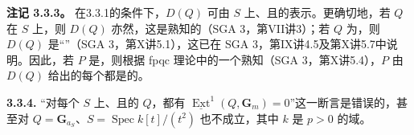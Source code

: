 \textbf{注记 3.3.3。} 在3.3.1的条件下，$D(Q)$ 可由 $S$ 上、且的表示。更确切地，若 $Q$ 在 $S$ 上，则 $D(Q)$ 亦然，这是熟知的（SGA 3，第VII讲3）；若 $Q$ 为，则 $D(Q)$ 是“”（SGA 3，第X讲5.1），这已在 SGA 3，第IX讲4.5及第X讲5.7中说明。因此，若 $P$ 是，则根据 fpqc 理论中的一个熟知（SGA 3，第X讲5.4），$P$ 由 $D(Q)$ 给出的每个都是的。

\textbf{3.3.4.} “对每个 $S$ 上、且的 $Q$，都有 $\underline{\operatorname{Ext}}^1(Q,\mathbf G_m)=0$”这一断言是错误的，甚至对 $Q=\mathbf G_{a_S}$、$S=\operatorname{Spec}k[t]/(t^2)$ 也不成立，其中 $k$ 是 $p>0$ 的域。


